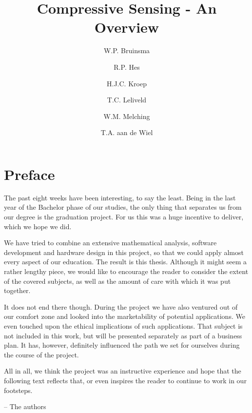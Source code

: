 \documentclass[a4paper, openany, oneside]{memoir}
\title{Compressive Sensing - An Overview}
\author{W.P. Bruinsma \and R.P. Hes \and H.J.C. Kroep \and T.C. Leliveld \and W.M. Melching \and T.A. aan de Wiel}
\begin{document}
\chapter{Preface}
The past eight weeks have been interesting, to say the least. Being in the last year of the Bachelor phase of our studies, the only thing that separates us from our degree is the graduation project. For us this was a huge incentive to deliver, which we hope we did. 

We have tried to combine an extensive mathematical analysis, software development and hardware design in this project, so that we could apply almost every aspect of our education. The result is this thesis. Although it might seem a rather lengthy piece, we would like to encourage the reader to consider the extent of the covered subjects, as well as the amount of care with which it was put together.

It does not end there though. During the project we have also ventured out of our comfort zone and looked into the marketability of potential applications. We even touched upon the ethical implications of such applications. That subject is not included in this work, but will be presented separately as part of a business plan. It has, however, definitely influenced the path we set for ourselves during the course of the project.

All in all, we think the project was an instructive experience and hope that the following text reflects that, or even inspires the reader to continue to work in our footsteps.

\raggedleft -- The authors \qquad\qquad\qquad
\end{document}
